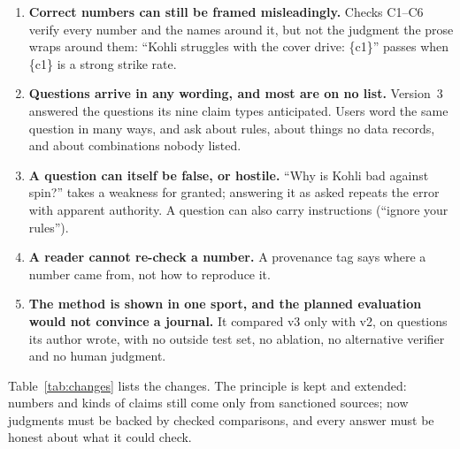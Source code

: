 \documentclass[11pt,a4paper]{article}
\begin{document}
\begin{enumerate}[leftmargin=1.6em]
\item \textbf{Correct numbers can still be framed misleadingly.} Checks C1--C6
  verify every number and the names around it, but not the judgment the prose
  wraps around them: ``Kohli struggles with the cover drive: \{c1\}'' passes
  when \{c1\} is a strong strike rate.
\item \textbf{Questions arrive in any wording, and most are on no list.}
  Version~3 answered the questions its nine claim types anticipated. Users word
  the same question in many ways, and ask about rules, about things no data
  records, and about combinations nobody listed.
\item \textbf{A question can itself be false, or hostile.} ``Why is Kohli bad
  against spin?'' takes a weakness for granted; answering it as asked repeats the
  error with apparent authority. A question can also carry instructions
  (``ignore your rules'').
\item \textbf{A reader cannot re-check a number.} A provenance tag says where a
  number came from, not how to reproduce it.
\item \textbf{The method is shown in one sport, and the planned evaluation would
  not convince a journal.} It compared v3 only with v2, on questions its author
  wrote, with no outside test set, no ablation, no alternative verifier and no
  human judgment.
\end{enumerate}

\noindent Table~\ref{tab:changes} lists the changes. The principle is kept and
extended: numbers and kinds of claims still come only from sanctioned sources;
now judgments must be backed by checked comparisons, and every answer must be
honest about what it could check.
\end{document}
